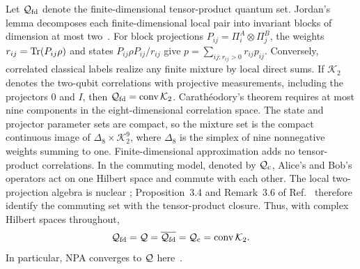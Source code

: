 \documentclass[11pt]{article}
\theoremstyle{remark}\newtheorem{remark}[theorem]{Remark}
\begin{document}
Let $\mathcal Q_{\rm fd}$ denote the finite-dimensional tensor-product quantum set.
Jordan's lemma decomposes each finite-dimensional local pair into invariant
blocks of dimension at most two~\cite{Halmos1969,Masanes2005,PanwarPandyaWiesniak2022}.
For block projections $P_{ij}=\Pi_i^A\otimes\Pi_j^B$, the weights
$r_{ij}=\operatorname{Tr}(P_{ij}\rho)$ and states $P_{ij}\rho P_{ij}/r_{ij}$ give
$p=\sum_{ij:r_{ij}>0}r_{ij}p_{ij}$. Conversely, correlated classical labels
realize any finite mixture by local direct sums. If $\mathcal K_2$ denotes
the two-qubit correlations with projective measurements, including the
projectors $0$ and $I$, then $\mathcal Q_{\rm fd}=\operatorname{conv}\mathcal K_2$.
Carath\'eodory's theorem requires at most nine components in the
eight-dimensional correlation space. The state and projector parameter sets
are compact, so the mixture set is the compact continuous image of
$\Delta_8\times\mathcal K_2^9$, where $\Delta_8$ is the simplex of nine
nonnegative weights summing to one. Finite-dimensional approximation adds no
tensor-product correlations. In the commuting model, denoted by $\mathcal Q_{\rm c}$,
Alice's and Bob's operators act on one Hilbert space and commute with each other.
The local two-projection algebra is nuclear
\cite[Sec.~4, Example~7(2)]{ScholzWerner2008}; Proposition~3.4 and
Remark~3.6 of Ref.~\cite{Fritz2012} therefore identify the commuting set with
the tensor-product closure. Thus, with complex Hilbert spaces throughout,
\begin{equation}
\mathcal Q_{\rm fd}=\mathcal Q=\overline{\mathcal Q_{\rm fd}}=\mathcal Q_{\rm c}
=\operatorname{conv}\mathcal K_2.
\label{supp:eq:quantum-model-equality}
\end{equation}
In particular, NPA converges to $\mathcal Q$ here~\cite[Theorem~8]{NPA2008}.
\end{document}
